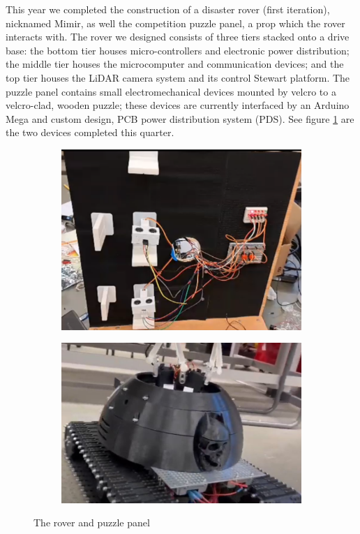 \documentclass[a4paper, 10pt]{article}
\begin{document}
	This year we completed the construction of a disaster rover (first iteration), nicknamed Mimir, as well the competition puzzle panel, a prop which the rover interacts with. The rover we designed consists of three tiers stacked onto a drive base: the bottom tier houses micro-controllers and electronic power distribution; the middle tier houses the microcomputer and communication devices; and the top tier houses the LiDAR camera system and its control Stewart platform. The puzzle panel contains small electromechanical devices mounted by velcro to a velcro-clad, wooden puzzle; these devices are currently interfaced by an Arduino Mega and custom design, PCB power distribution system (PDS). See figure \ref{executive_summary_pictures} are the two devices completed this quarter.
	
		\begin{figure}[h]
			\centering
			\begin{subfigure}[h]{0.44\textwidth}
				\centering
				\includegraphics[width=\textwidth]{Photos/Puzzle Panel Powered}
			\end{subfigure}
			\hfill
			\begin{subfigure}[h]{0.55\textwidth}
				\centering
				\includegraphics[width=\textwidth]{Photos/rover_front}
			\end{subfigure}
			\centering
			\caption{The rover and puzzle panel}
			\label{executive_summary_pictures}
		\end{figure}
	
\end{document}
